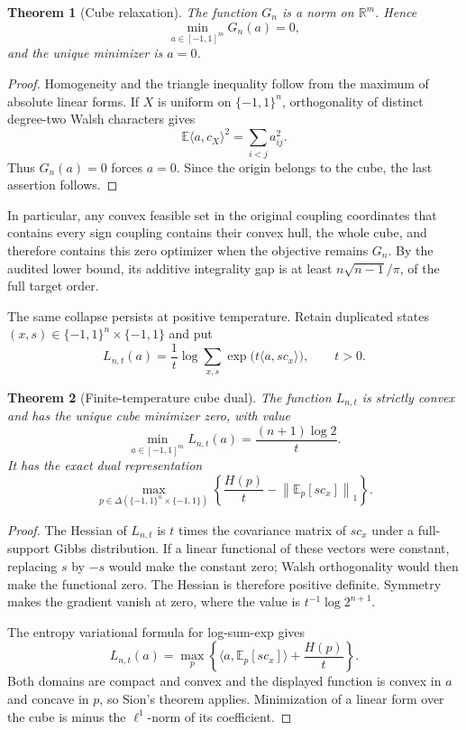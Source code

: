 \documentclass[11pt]{article}
\newtheorem{theorem}{Theorem}
\newcommand{\eps}{\{-1,1\}}
\newcommand{\E}{\mathbb E}
\begin{document}
\begin{theorem}[Cube relaxation]
\label{thm:cube}
The function \(G_n\) is a norm on \(\mathbb R^m\).  Hence
\[
 \min_{a\in[-1,1]^m}G_n(a)=0,
\]
and the unique minimizer is \(a=0\).
\end{theorem}

\begin{proof}
Homogeneity and the triangle inequality follow from the maximum of absolute
linear forms.  If \(X\) is uniform on \(\eps^n\), orthogonality of distinct
degree-two Walsh characters gives
\[
 \E\langle a,c_X\rangle^2=\sum_{i<j}a_{ij}^2.
\]
Thus \(G_n(a)=0\) forces \(a=0\).  Since the origin belongs to the cube, the
last assertion follows.
\end{proof}

In particular, any convex feasible set in the original coupling coordinates
that contains every sign coupling contains their convex hull, the whole cube,
and therefore contains this zero optimizer when the objective remains \(G_n\).
By the audited lower bound, its additive integrality gap is at least
\(n\sqrt{n-1}/\pi\), of the full target order.

The same collapse persists at positive temperature.  Retain duplicated
states \((x,s)\in\eps^n\times\eps\) and put
\[
 L_{n,t}(a)=\frac1t\log\sum_{x,s}
 \exp\bigl(t\langle a,s c_x\rangle\bigr),\qquad t>0.
\]

\begin{theorem}[Finite-temperature cube dual]
\label{thm:cubedual}
The function \(L_{n,t}\) is strictly convex and has the unique cube minimizer
zero, with value
\[
 \min_{a\in[-1,1]^m}L_{n,t}(a)=\frac{(n+1)\log2}{t}.
\]
It has the exact dual representation
\[
 \max_{p\in\Delta(\eps^n\times\eps)}
 \left\{
  \frac{H(p)}t-\left\|\E_p[s c_x]\right\|_1
 \right\}.
\]
\end{theorem}

\begin{proof}
The Hessian of \(L_{n,t}\) is \(t\) times the covariance matrix of \(s c_x\)
under a full-support Gibbs distribution.  If a linear functional of these
vectors were constant, replacing \(s\) by \(-s\) would make the constant zero;
Walsh orthogonality would then make the functional zero.  The Hessian is
therefore positive definite.  Symmetry makes the gradient vanish at zero,
where the value is \(t^{-1}\log 2^{n+1}\).

The entropy variational formula for log-sum-exp gives
\[
 L_{n,t}(a)=\max_p\left\{
 \langle a,\E_p[s c_x]\rangle+\frac{H(p)}t\right\}.
\]
Both domains are compact and convex and the displayed function is convex in
 \(a\) and concave in \(p\), so Sion's theorem applies.  Minimization of a
linear form over the cube is minus the \(\ell^1\)-norm of its coefficient.
\end{proof}
\end{document}
